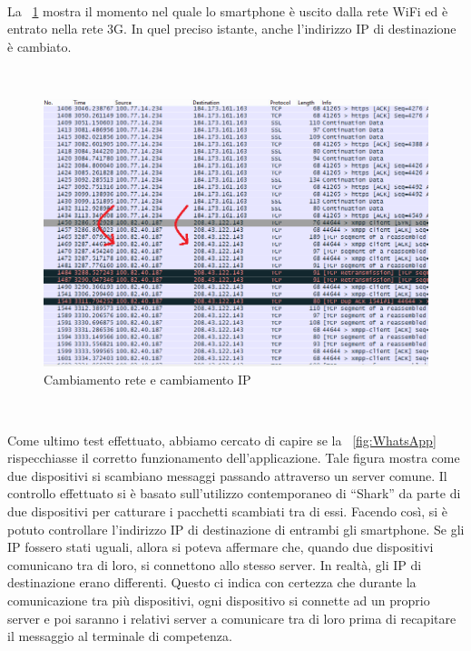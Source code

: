 \documentclass[a4paper,11pt]{book}
\begin{document}
~

La \figurename ~\ref{fig:ip-changed} mostra il momento nel quale lo smartphone \`e uscito dalla rete WiFi ed \`e entrato nella rete 3G. In quel preciso istante, anche l'indirizzo IP di destinazione  \`e cambiato.

~

\begin{figure}[!ht]
\centering
\includegraphics[scale = 0.5]{ip-changed}
\caption{Cambiamento rete e cambiamento IP}
\label{fig:ip-changed}
\end{figure}

~


\clearpage 

Come ultimo test effettuato, abbiamo cercato di capire se la \figurename ~\ref{fig:WhatsApp} rispecchiasse il corretto funzionamento dell'applicazione.
Tale figura mostra come due dispositivi si scambiano messaggi passando attraverso un server comune. 
Il controllo effettuato si \`e basato sull'utilizzo contemporaneo di ``Shark'' da parte di due dispositivi per catturare i pacchetti scambiati tra di essi. 
Facendo cos\`i, si \`e potuto controllare l'indirizzo IP di destinazione di entrambi gli smartphone. Se gli IP fossero stati uguali, allora si poteva affermare che, quando due dispositivi comunicano tra di loro, si connettono allo stesso server.
In realt\`a, gli IP di destinazione erano differenti. Questo ci indica con certezza che durante la comunicazione tra pi\`u dispositivi, ogni dispositivo si connette ad un proprio server e poi saranno i relativi server a comunicare tra di loro prima di recapitare il messaggio al terminale di competenza.

~
\end{document}
